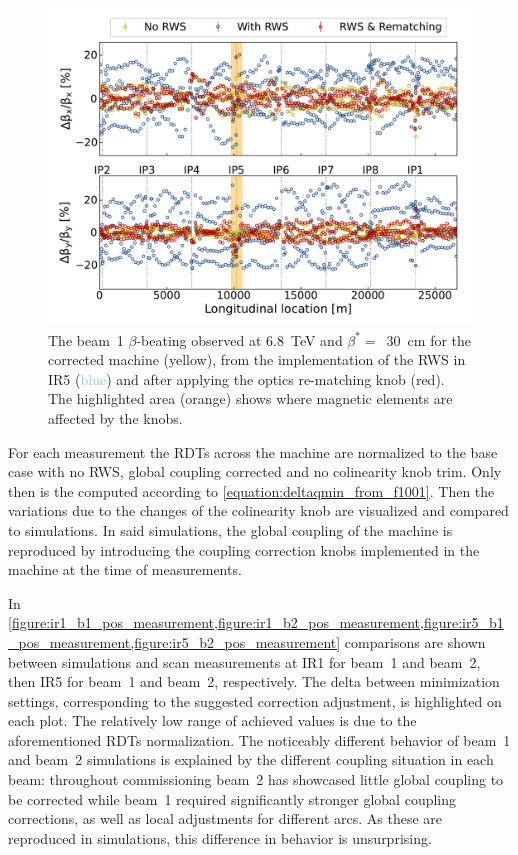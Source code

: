 \begin{figure}[!htb]
    \centering
    \includegraphics*[width=\textwidth]{Figures/IR_Coupling_Correction/rematching_knob_efficiency.pdf}
    \caption{The beam~\num{1} \(\beta\)-beating observed at \qty{6.8}{\tera\electronvolt} and \(\beta^{*}=\)~\qty{30}{\centi\meter} for the corrected machine (\textcolor{butter}{yellow}), from the implementation of the RWS in IR\num{5} (\textcolor{skyblue}{blue}) and after applying the optics re-matching knob (\textcolor{scarletred}{red}). The highlighted area (\textcolor{highlightorange}{orange}) shows where magnetic elements are affected by the knobs.}
    \label{figure:ir5_rws_rematching}
\end{figure}

For each measurement the RDTs across the machine are normalized to the base case with no RWS, global coupling corrected and no colinearity knob trim.
Only then is the  computed according to \cref{equation:deltaqmin_from_f1001}.
Then the variations due to the changes of the colinearity knob are visualized and compared to simulations.
In said simulations, the global coupling of the machine is reproduced by introducing the coupling correction knobs implemented in the machine at the time of measurements.

In \cref{figure:ir1_b1_pos_measurement,figure:ir1_b2_pos_measurement,figure:ir5_b1_pos_measurement,figure:ir5_b2_pos_measurement} comparisons are shown between simulations and scan measurements at IR\num{1} for beam~\num{1} and beam~\num{2}, then IR\num{5} for beam~\num{1} and beam~\num{2}, respectively.
The delta between minimization settings, corresponding to the suggested correction adjustment, is highlighted on each plot.
The relatively low range of achieved  values is due to the aforementioned \glspl{RDT} normalization.
The noticeably different behavior of beam~\num{1} and beam~\num{2} simulations is explained by the different coupling situation in each beam: throughout commissioning beam~\num{2} has showcased little global coupling to be corrected while beam~\num{1} required significantly stronger global coupling corrections, as well as local adjustments for different arcs.
As these are reproduced in simulations, this difference in behavior is unsurprising.


